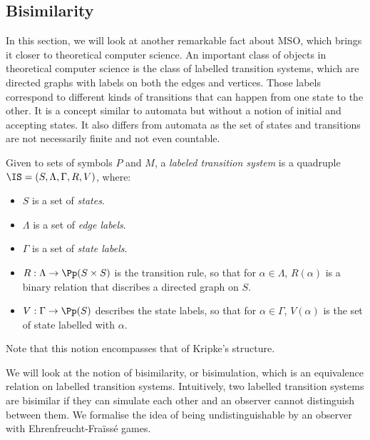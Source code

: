 
\subsection{Bisimilarity}

In this section, we will look at another remarkable fact
about MSO, which brings it closer to theoretical computer science.
An important class of objects in theoretical computer science
is the class of labelled transition systems,
which are directed graphs with labels on both the edges and vertices.
Those labels correspond to different kinds of transitions
that can happen from one state to the other. It is a concept similar
to automata but without a notion of initial and accepting states.
It also differs from automata as the set of states and transitions are not necessarily finite
and not even countable.

\begin{definition}
    Given to sets of symbols $P$ and $M$,
    a \emph{labeled transition system}
    is a quadruple $\IS = (S, \Lambda, \Gamma, R, V)$, where:
    \begin{itemize}
        \item $S$ is a set of \emph{states}.
        \item $\Lambda$ is a set of \emph{edge labels}.
        \item $\Gamma$ is a set of \emph{state labels}.
        \item $R: \Lambda \to \Pp(S \times S)$ is the transition rule,
            so that for $\alpha \in \Lambda$, $R(\alpha)$ is a binary relation
            that discribes a directed graph on $S$.
        \item $V: \Gamma \to \Pp(S)$ describes the state labels,
            so that for $\alpha \in \Gamma$,
            $V(\alpha)$ is the set of state labelled with $\alpha$.
    \end{itemize}

    Note that this notion encompasses that of Kripke's structure.
\end{definition}

We will look at the notion of bisimilarity, or bisimulation, which is
an equivalence relation on labelled transition systems.
Intuitively, two labelled transition systems are bisimilar if
they can simulate each other and an observer cannot distinguish
between them.
We formalise the idea of being undistinguishable
by an observer with Ehrenfreucht-Fraïssé games.

